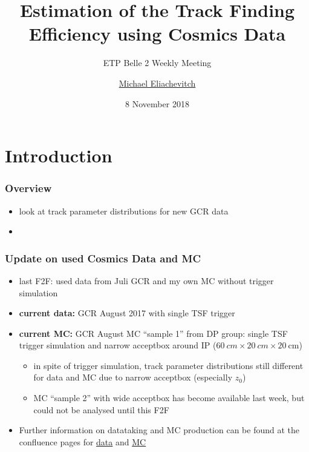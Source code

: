 \documentclass[18pt]{beamer}
\title{Estimation of the Track Finding Efficiency using Cosmics Data}
\subtitle{ETP Belle 2 Weekly Meeting}
\author{\underline{Michael Eliachevitch}}
\date{8 November 2018}
\institute{ETP -- KIT}
\begin{document}

\section{Introduction}
\begin{frame}
  \titlepage
\end{frame}

\begin{frame}
  \frametitle{Overview}
  \begin{itemize}
  \item look at track parameter distributions for new GCR data
  \item 
  \end{itemize}
  
\end{frame}

\begin{frame}
  \frametitle{Update on used Cosmics Data and MC}
  \begin{itemize}
  \item last F2F: used data from Juli GCR and my own MC without trigger simulation
  \item \textbf{current data:} GCR August 2017  with single TSF trigger
  \item \textbf{current MC:} GCR August MC ``sample 1'' from DP group: single TSF trigger simulation and narrow acceptbox around IP ($\SI{60}{cm} \times \SI{20}{cm} \times \SI{20}{\cm}$)
    \begin{itemize}
    \item in spite of trigger simulation, track parameter distributions still different  for data and MC due to narrow acceptbox (especially $z_0$)
    \item MC ``sample 2'' with wide acceptbox has become available last week, but could not be analysed until this F2F
    \end{itemize}
  \item Further information on datataking and MC production can be found at the confluence pages for
    \href{https://confluence.desy.de/display/BI/Data+Production+Global+Cosmics+Run+Data\#DataProductionGlobalCosmicsRunData-Runinfo}{data}
    and \href{https://confluence.desy.de/display/BI/Data+Production+Global+Cosmics+Run+MC}{MC}
  \end{itemize}    
\end{frame}
\end{document}

